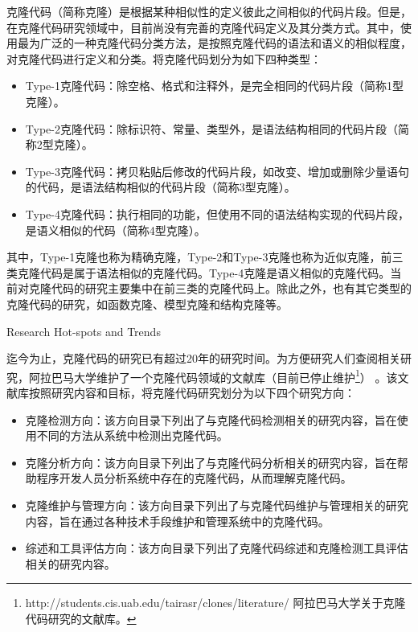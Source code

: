 克隆代码（简称克隆）是根据某种相似性的定义彼此之间相似的代码片段\cite{roy2007survey}。但是，在克隆代码研究领域中，目前尚没有完善的克隆代码定义及其分类方式。其中，使用最为广泛的一种克隆代码分类方法，是按照克隆代码的语法和语义的相似程度，对克隆代码进行定义和分类\cite{koschke2007survey}。将克隆代码划分为如下四种类型：
\begin{itemize}
\item 
Type-1克隆代码：除空格、格式和注释外，是完全相同的代码片段（简称1型克隆）。
\item 
Type-2克隆代码：除标识符、常量、类型外，是语法结构相同的代码片段（简称2型克隆）。
\item 
Type-3克隆代码：拷贝粘贴后修改的代码片段，如改变、增加或删除少量语句的代码，是语法结构相似的代码片段（简称3型克隆）。
\item 
Type-4克隆代码：执行相同的功能，但使用不同的语法结构实现的代码片段，是语义相似的代码（简称4型克隆）。
\end{itemize}

其中，Type-1克隆也称为精确克隆，Type-2和Type-3克隆也称为近似克隆，前三类克隆代码是属于语法相似的克隆代码。Type-4克隆是语义相似的克隆代码。当前对克隆代码的研究主要集中在前三类的克隆代码上。除此之外，也有其它类型的克隆代码的研究，如函数克隆\cite{roy2008empirical}、模型克隆\cite{alalfi2012models}和结构克隆\cite{basit2009data}\cite{basit2005detecting}等。%

{Research Hot-spots and Trends}

迄今为止，克隆代码的研究已有超过20年的研究时间。为方便研究人们查阅相关研究，阿拉巴马大学维护了一个克隆代码领域的文献库（目前已停止维护\footnote{ http://students.cis.uab.edu/tairasr/clones/literature/ 阿拉巴马大学关于克隆代码研究的文献库。}） 。该文献库按照研究内容和目标，将克隆代码研究划分为以下四个研究方向：

\begin{itemize}
\item 
克隆检测方向：该方向目录下列出了与克隆代码检测相关的研究内容，旨在使用不同的方法从系统中检测出克隆代码。
\item 
克隆分析方向：该方向目录下列出了与克隆代码分析相关的研究内容，旨在帮助程序开发人员分析系统中存在的克隆代码，从而理解克隆代码。
\item 
克隆维护与管理方向：该方向目录下列出了与克隆代码维护与管理相关的研究内容，旨在通过各种技术手段维护和管理系统中的克隆代码。
\item 
综述和工具评估方向：该方向目录下列出了克隆代码综述和克隆检测工具评估相关的研究内容。
\end{itemize}


